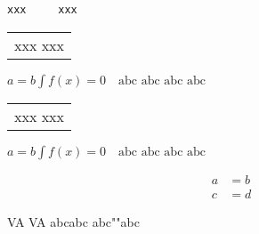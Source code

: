 \documentclass{article}
\begin{document}
\begin{lstlisting}[columns=flexible]
 xxx     xxx
\end{lstlisting}
\begin{tabular}{l}
xxx xxx
\end{tabular}

$a=b \int f(x) =0\quad  \text{abc abc abc abc} $


\begin{tabular}{l}
xxx xxx
\end{tabular}

$a=b \int f(x) =0\quad \text{abc abc abc abc} $

\begin{align}
a &=b \\
c &=d
\end{align}

\bigskip

VA VA abc\hspace{0pt}abc abc""abc
\lipsum[1]
\end{document}
